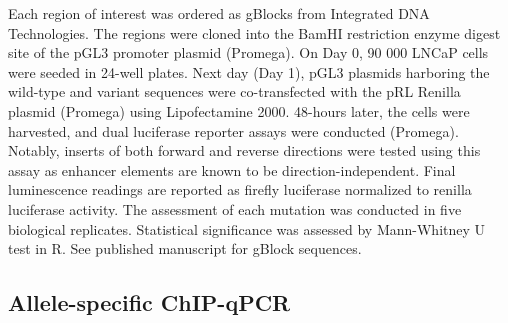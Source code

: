 Each region of interest was ordered as gBlocks from Integrated DNA Technologies.
The regions were cloned into the BamHI restriction enzyme digest site of the pGL3 promoter plasmid (Promega).
On Day 0, 90 000 LNCaP cells were seeded in 24-well plates.
Next day (Day 1), pGL3 plasmids harboring the wild-type and variant sequences were co-transfected with the pRL Renilla plasmid (Promega) using Lipofectamine 2000.
48-hours later, the cells were harvested, and dual luciferase reporter assays were conducted (Promega).
Notably, inserts of both forward and reverse directions were tested using this assay as enhancer elements are known to be direction-independent.
Final luminescence readings are reported as firefly luciferase normalized to renilla luciferase activity.
The assessment of each mutation was conducted in five biological replicates.
Statistical significance was assessed by Mann-Whitney U test in R.
See published manuscript for gBlock sequences.

\subsection{Allele-specific ChIP-qPCR}

